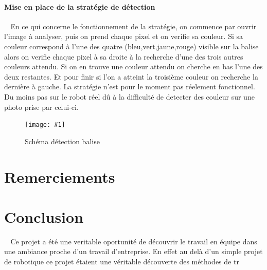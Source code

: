 \documentclass[12pt]{article}
\def\tab{$\>\>\>\>$}
\newcommand\img[2]{
\begin{figure}[!h]
  \centering
    \texttt{[image: \#1]}
  \caption{#2}
  \label{img:#1}
\end{figure}
}
\begin{document}
\paragraph{Mise en place de la stratégie de détection\\}
\tab En ce qui concerne le fonctionnement de la stratégie, on commence par ouvrir l'image à analyser, puis on prend chaque pixel et on verifie sa couleur. Si sa couleur correspond à l'une des quatre (bleu,vert,jaune,rouge) visible sur la balise alors on verifie chaque pixel à sa droite à la recherche d'une des trois autres couleurs attendu. Si on en trouve une couleur attendu on cherche en bas l'une des deux restantes. Et pour finir si l'on a atteint la troisième couleur on recherche la dernière à gauche. La stratégie n'est pour le moment pas réelement fonctionnel. Du moins pas sur le robot réel dû à la difficulté de detecter des couleur sur une photo prise par celui-ci.

\img{Images/baliseschema.png}{Schéma détection balise}

\newpage

\section{Remerciements}

\newpage

\section{Conclusion}
\tab Ce projet a été une veritable oportunité de découvrir le travail en équipe dans une ambiance proche d'un travail d'entreprise. En effet au delà d'un simple projet de robotique ce projet étaient une véritable découverte des méthodes de tr
\end{document}
